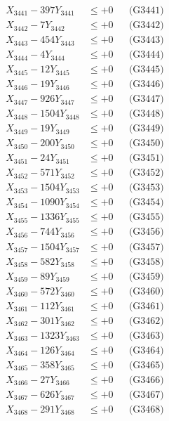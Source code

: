 \documentclass[a4paper,10pt]{article}
\begin{document}
{\begin{align}
\allowbreak
X_{3441} - 397Y_{3441} &\leq +0 && \text{(G3441)} \\
X_{3442} - 7Y_{3442} &\leq +0 && \text{(G3442)} \\
X_{3443} - 454Y_{3443} &\leq +0 && \text{(G3443)} \\
X_{3444} - 4Y_{3444} &\leq +0 && \text{(G3444)} \\
X_{3445} - 12Y_{3445} &\leq +0 && \text{(G3445)} \\
X_{3446} - 19Y_{3446} &\leq +0 && \text{(G3446)} \\
X_{3447} - 926Y_{3447} &\leq +0 && \text{(G3447)} \\
X_{3448} - 1504Y_{3448} &\leq +0 && \text{(G3448)} \\
X_{3449} - 19Y_{3449} &\leq +0 && \text{(G3449)} \\
X_{3450} - 200Y_{3450} &\leq +0 && \text{(G3450)} \\
\allowbreak
X_{3451} - 24Y_{3451} &\leq +0 && \text{(G3451)} \\
X_{3452} - 571Y_{3452} &\leq +0 && \text{(G3452)} \\
X_{3453} - 1504Y_{3453} &\leq +0 && \text{(G3453)} \\
X_{3454} - 1090Y_{3454} &\leq +0 && \text{(G3454)} \\
X_{3455} - 1336Y_{3455} &\leq +0 && \text{(G3455)} \\
X_{3456} - 744Y_{3456} &\leq +0 && \text{(G3456)} \\
X_{3457} - 1504Y_{3457} &\leq +0 && \text{(G3457)} \\
X_{3458} - 582Y_{3458} &\leq +0 && \text{(G3458)} \\
X_{3459} - 89Y_{3459} &\leq +0 && \text{(G3459)} \\
X_{3460} - 572Y_{3460} &\leq +0 && \text{(G3460)} \\
\allowbreak
X_{3461} - 112Y_{3461} &\leq +0 && \text{(G3461)} \\
X_{3462} - 301Y_{3462} &\leq +0 && \text{(G3462)} \\
X_{3463} - 1323Y_{3463} &\leq +0 && \text{(G3463)} \\
X_{3464} - 126Y_{3464} &\leq +0 && \text{(G3464)} \\
X_{3465} - 358Y_{3465} &\leq +0 && \text{(G3465)} \\
X_{3466} - 27Y_{3466} &\leq +0 && \text{(G3466)} \\
X_{3467} - 626Y_{3467} &\leq +0 && \text{(G3467)} \\
X_{3468} - 291Y_{3468} &\leq +0 && \text{(G3468)} \\

\end{align}}
\end{document}
